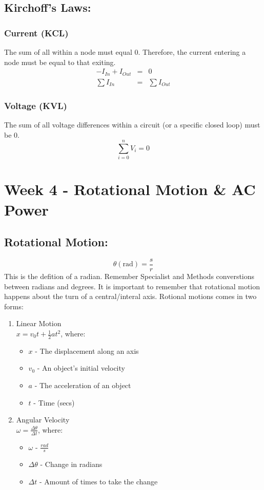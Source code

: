 \documentclass[a5paper]{report}
\begin{document}
	\subsection*{Kirchoff's Laws:}
	\subsubsection*{Current (KCL)}
	The sum of all within a node must equal 0. Therefore, the current entering a node must be equal to that exiting.
	\begin{eqnarray*}
		-I_{In}+I_{Out} &=& 0 \\
		\sum I_{In} &=& \sum I_{Out}
	\end{eqnarray*}

	\subsubsection{Voltage (KVL)}
	The sum of all voltage differences within a circuit (or a specific closed loop) must be 0.
	$$\sum_{i=0}^{n}V_{i}=0$$

	\section*{Week 4 - Rotational Motion \& AC Power}
	\subsection*{Rotational Motion:}
	$$\theta (\text{rad})=\frac{s}{r}$$
	This is the defition of a radian. Remember Specialist and Methods converstions between radians and degrees. It is important to remember that rotational motion happens about the turn of a central/interal axis. Rotional motions comes in two forms:
	\begin{enumerate}
		\item Linear Motion\\
		$x=v_{0}t+\frac{1}{2}at^{2}$, where:
		\begin{itemize}
			\item $x$ - The displacement along an axis
			\item $v_{0}$ - An object's initial velocity
			\item $a$ - The acceleration of an object
			\item $t$ - Time (secs)
		\end{itemize}
		\item Angular Velocity\\
		$\omega = \frac{\Delta\theta}{\Delta t}$, where:
		\begin{itemize}
			\item $\omega$ - $\frac{rad}{s}$
			\item $\Delta\theta$ - Change in radians
			\item $\Delta t$ - Amount of times to take the change
		\end{itemize}
	\end{enumerate}
\end{document}
